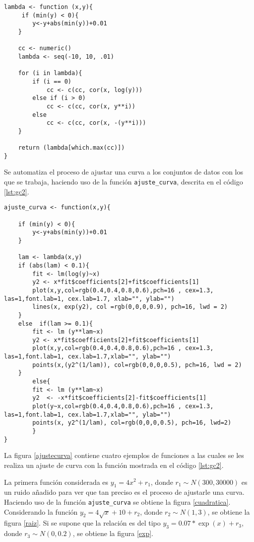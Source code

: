 \documentclass[12pt,letterpaper]{article}
\begin{document}
\begin{lstlisting}[label=lst:gc1,caption=Función \texttt{lambda}., frame = single]
lambda <- function (x,y){
     if (min(y) < 0){
        y<-y+abs(min(y))+0.01
    }
        
    cc <- numeric()
    lambda <- seq(-10, 10, .01)
    
    for (i in lambda){
        if (i == 0)
            cc <- c(cc, cor(x, log(y)))
        else if (i > 0)
            cc <- c(cc, cor(x, y**i))
        else
            cc <- c(cc, cor(x, -(y**i)))
    }

    return (lambda[which.max(cc)])
}
\end{lstlisting} 
Se automatiza el proceso de ajustar una curva a los conjuntos de datos con los que se trabaja, haciendo uso de la función \texttt{ajuste\_curva}, descrita en el código \ref{lst:gc2}.
\begin{lstlisting}[label=lst:gc2,caption=Función \texttt{ajuste\_curva}., frame = single]
ajuste_curva <- function(x,y){
    
    if (min(y) < 0){
        y<-y+abs(min(y))+0.01
    }
    
    lam <- lambda(x,y)
    if (abs(lam) < 0.1){
        fit <- lm(log(y)~x)
        y2 <- x*fit$coefficients[2]+fit$coefficients[1]
        plot(x,y,col=rgb(0.4,0.4,0.8,0.6),pch=16 , cex=1.3, las=1,font.lab=1, cex.lab=1.7, xlab="", ylab="")
        lines(x, exp(y2), col =rgb(0,0,0,0.9), pch=16, lwd = 2)
    }
    else  if(lam >= 0.1){
        fit <- lm (y**lam~x)
        y2 <- x*fit$coefficients[2]+fit$coefficients[1]
        plot(x,y,col=rgb(0.4,0.4,0.8,0.6),pch=16 , cex=1.3, las=1,font.lab=1, cex.lab=1.7,xlab="", ylab="")
        points(x,(y2^(1/lam)), col=rgb(0,0,0,0.5), pch=16, lwd = 2)
    }
        else{
        fit <- lm (y**lam~x)
        y2  <- -x*fit$coefficients[2]-fit$coefficients[1]
        plot(y~x,col=rgb(0.4,0.4,0.8,0.6),pch=16 , cex=1.3, las=1,font.lab=1, cex.lab=1.7,xlab="", ylab="")
        points(x, y2^(1/lam), col=rgb(0,0,0,0.5), pch=16, lwd=2)
        }
}
\end{lstlisting} 

La figura \ref{ajustecurva} contiene cuatro ejemplos de funciones a las cuales se les realiza un ajuste de curva con la función mostrada en el código \ref{lst:gc2}.

La primera función considerada es $y_1=4x^2 + r_1$, donde $r_1 \sim N(300,30000)$ es un ruido añadido para ver que tan preciso es el proceso de ajustarle una curva. Haciendo uso de la función \texttt{ajuste\_curva} se obtiene la figura \ref{cuadratica}. Considerando la función $y_2=4\sqrt{x}+10 + r_2 $, donde $r_2 \sim N(1,3)$, se obtiene la figura \ref{raiz}. Si se supone que la relación es del tipo $y_3=0.07*\exp(x) + r_3$, donde $r_3 \sim N(0, 0.2)$, se obtiene la figura \ref{exp}. 
\end{document}
